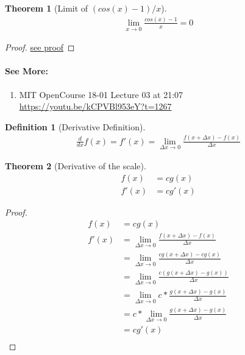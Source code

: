 \documentclass{article}
\newtheorem{theorem}{Theorem}[section]
\theoremstyle{definition}
\newtheorem{definition}{Definition}[theorem]
\begin{document}
\clearpage
\begin{theorem}[Limit of $(cos(x)-1)/x$]\label{theorems:limits:cosxminusoneoverx}
	\begin{align*}
	\lim_{x \to 0} \frac {cos(x)-1} {x} = 0
	\end{align*}
\end{theorem}
\begin{proof}
	\href{https://proofwiki.org/wiki/Limit_of_(Cosine_(X)_-_1)_over_X}{see proof}
\end{proof}
\paragraph{See More:}
\begin{enumerate}
	\item {MIT OpenCourse 18-01 Lecture 03 at 21:07\\
\url{https://youtu.be/kCPVBl953eY?t=1267}}
\end{enumerate}

\begin{definition}[Derivative Definition]\label{definitions:derivative}
\begin{align*}
\frac {d}{dx} f(x) = f'(x) = \lim_{\Delta x \to 0} {\frac {f(x+\Delta x) - f(x)} {\Delta x}}
\end{align*}
\end{definition}

\begin{theorem}[Derivative of the scale]\label{theorems:calculus:derivatives:scale}
	\begin{align*}
	f(x) &= cg(x)\\
	f'(x) &= cg'(x)
	\end{align*}
\end{theorem}
\begin{proof}
	\begin{align*}
		f(x) &= cg(x) \\
		f'(x) &= \lim_{\Delta x \to 0} {\frac {f(x+\Delta x) - f(x)} {\Delta x}} \\
		&= \lim_{\Delta x \to 0} {\frac {cg(x+\Delta x) - cg(x)} {\Delta x}} \\
		&= \lim_{\Delta x \to 0} {\frac {c(g(x+\Delta x) - g(x))} {\Delta x}} \\
		&= \lim_{\Delta x \to 0} {c * \frac {g(x+\Delta x) - g(x)} {\Delta x}} \\
		&= c*\lim_{\Delta x \to 0} {\frac {g(x+\Delta x) - g(x)} {\Delta x}} \\
		&= cg'(x) \\
	\end{align*}
\end{proof}
\end{document}
